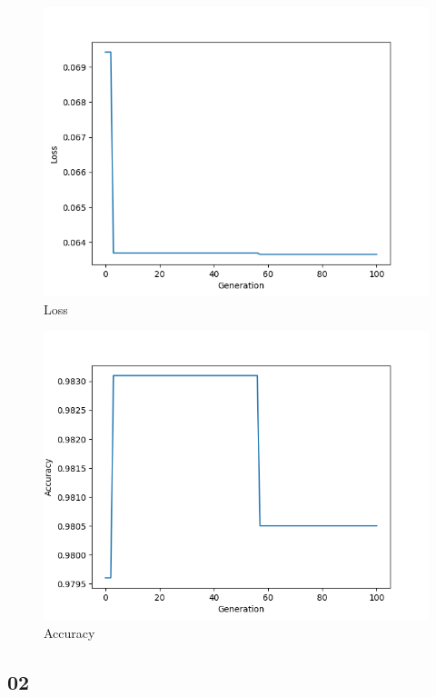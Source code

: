 \documentclass[twoside,conference,a4paper]{IEEEtran}
\begin{document}
\begin{figure}[htbp]
        \centering \includegraphics[width=1\columnwidth]{./imgs/01_mnist.png}
        \caption{
                \label{fig:loss_mnist_01}
                Loss
        }
\end{figure}
\begin{figure}[htbp]
        \centering \includegraphics[width=1\columnwidth]{./imgs/01_mnist_acc.png}
        \caption{
                \label{fig:acc_mnist_01}
                Accuracy
        }
\end{figure}

\subsection{02}
\end{document}
